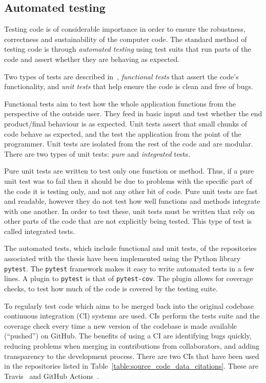 \subsection{Automated testing}

Testing code is of considerable importance in order to ensure the robustness,
correctness and sustainability of the computer code. The standard method of testing code is through
\textit{automated testing} using test suits that run parts of the code and
assert whether they are behaving as expected.

Two types of tests are described in~\cite{Percival2014}, \textit{functional
tests} that assert the code's functionality, and \textit{unit tests} that help
ensure the code is clean and free of bugs.

Functional tests aim to test how the whole application functions from the
perspective of the outside user. They feed in basic input and test whether the
end product/final behaviour is as expected. Unit tests assert that small chunks
of code behave as expected, and the test the application from the point of the
programmer. Unit tests are isolated from the rest of the code and are modular.
There are two types of unit tests: \textit{pure} and \textit{integrated} tests.

Pure unit tests are written to test only one function or method. Thus, if a pure
unit test was to fail then it should be due to problems with the specific part
of the code it is testing only, and not any other bit of code. Pure unit tests
are fast and readable, however they do not test how well functions and methods
integrate with one another. In order to test these, unit tests must be written
that rely on other parts of the code that are not explicitly being tested. This
type of test is called integrated tests.

The automated tests, which include functional and unit tests, of the
repositories associated with the thesis have been implemented using the Python
library \texttt{pytest}. The \texttt{pytest} framework
makes it easy to write automated tests in a few lines. A plugin to
\texttt{pytest} is that of \texttt{pytest-cov}. The plugin
allows for coverage checks, to test how much of the code is covered by the testing
suite.  %

To regularly test code which aims to be merged back into the original codebase
continuous integration (CI) systems are used. CIs perform the tests suite and
the coverage check every time a new version of the codebase is made available
(``pushed'') on GitHub. The benefits of using a CI are identifying bugs quickly,
reducing problems when merging in contributions from collaborators, and adding
transparency to the development process. There are two CIs that have been used
in the repositories listed in Table~\ref{table:source_code_data_citations}.
These are Travis~\cite{travis} and GitHub Actions~\cite{github_actions}.


